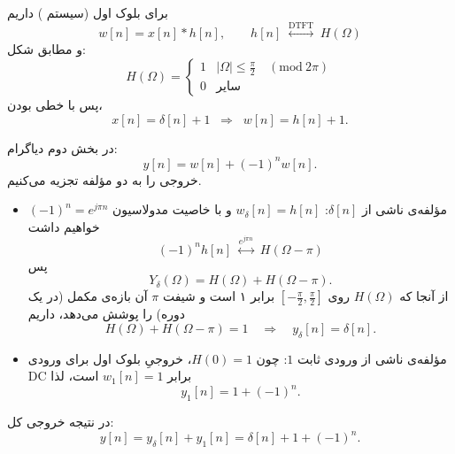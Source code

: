 برای بلوک اول (سیستم ) داریم
$$w[n]=x[n]*h[n],\qquad h[n]\;\overset{\text{DTFT}}{\longleftrightarrow}\;H(\Omega)$$
و مطابق شکل:
$$
H(\Omega)=
\begin{cases}
1 & |\Omega|\le \frac{\pi}{2}\quad (\mathrm{mod}\ 2\pi)\\
0 & \text{سایر }
\end{cases}
$$
پس با خطی بودن،
$$x[n]=\delta[n]+1 \;\;\Longrightarrow\;\; w[n]=h[n]+1.$$

در بخش دوم دیاگرام:
$$y[n]=w[n]+(-1)^n w[n].$$
خروجی را به دو مؤلفه تجزیه می‌کنیم.

\begin{itemize}
\item مؤلفه‌ی ناشی از $\delta[n]$: \quad $w_\delta[n]=h[n]$ و
با خاصیت مدولاسیون $(-1)^n=e^{j\pi n}$ خواهیم داشت
$$(-1)^n h[n]\;\overset{e^{j\pi n}}{\longleftrightarrow}\;H(\Omega-\pi)$$
پس
$$Y_\delta(\Omega)=H(\Omega)+H(\Omega-\pi).$$
از آنجا که $H(\Omega)$ روی $[-\frac{\pi}{2},\frac{\pi}{2}]$ برابر ۱ است و شیفت $\pi$ آن بازه‌ی مکمل (در یک دوره) را پوشش می‌دهد، داریم
$$H(\Omega)+H(\Omega-\pi)=1 \quad \Longrightarrow\quad y_\delta[n]=\delta[n].$$

\item مؤلفه‌ی ناشی از ورودی ثابت $1$: \quad چون $H(0)=1$، خروجیِ بلوک اول برای ورودی DC برابر $w_1[n]=1$ است، لذا
$$y_1[n]=1+(-1)^n.$$
\end{itemize}

در نتیجه خروجی کل:
$$
y[n]=y_\delta[n]+y_1[n]=\delta[n]+1+(-1)^n.
$$
